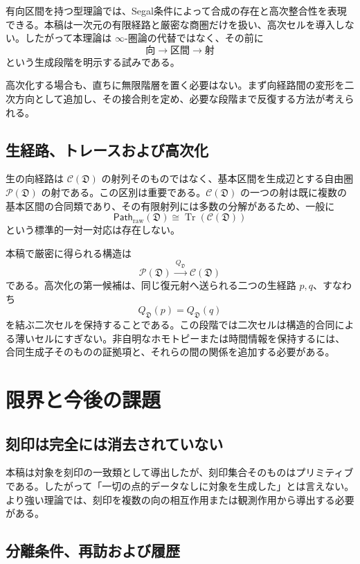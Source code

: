 \documentclass[a4paper,11pt]{ltjsarticle}
\theoremstyle{definition}
\theoremstyle{plain}
\newcommand{\Path}{\mathsf{Path}}
\begin{document}
有向区間を持つ型理論では、Segal条件によって合成の存在と高次整合性を表現できる\cite{RiehlShulman2017}。本稿は一次元の有限経路と厳密な商圏だけを扱い、高次セルを導入しない。したがって本理論は $\infty$-圏論の代替ではなく、その前に
\[
 \text{向}
 \longrightarrow
 \text{区間}
 \longrightarrow
 \text{射}
\]
という生成段階を明示する試みである。

高次化する場合も、直ちに無限階層を置く必要はない。まず向経路間の変形を二次方向として追加し、その接合則を定め、必要な段階まで反復する方法が考えられる。

\subsection{生経路、トレースおよび高次化}

生の向経路は $\mathcal C(\mathfrak D)$ の射列そのものではなく、基本区間を生成辺とする自由圏 $\mathcal P(\mathfrak D)$ の射である。この区別は重要である。$\mathcal C(\mathfrak D)$ の一つの射は既に複数の基本区間の合同類であり、その有限射列には多数の分解があるため、一般に
\[
 \Path_{\mathrm{raw}}(\mathfrak D)
 \cong
 \operatorname{Tr}(\mathcal C(\mathfrak D))
\]
という標準的一対一対応は存在しない。

本稿で厳密に得られる構造は
\[
 \boxed{
 \mathcal P(\mathfrak D)
 \xrightarrow{\ Q_{\mathfrak D}\ }
 \mathcal C(\mathfrak D)
 }
\]
である。高次化の第一候補は、同じ復元射へ送られる二つの生経路 $p,q$、すなわち
\[
 Q_{\mathfrak D}(p)=Q_{\mathfrak D}(q)
\]
を結ぶ二次セルを保持することである。この段階では二次セルは構造的合同による薄いセルにすぎない。非自明なホモトピーまたは時間情報を保持するには、合同生成子そのものの証拠項と、それらの間の関係を追加する必要がある。

\section{限界と今後の課題}

\subsection{刻印は完全には消去されていない}

本稿は対象を刻印の一致類として導出したが、刻印集合そのものはプリミティブである。したがって「一切の点的データなしに対象を生成した」とは言えない。より強い理論では、刻印を複数の向の相互作用または観測作用から導出する必要がある。

\subsection{分離条件、再訪および履歴}
\end{document}
